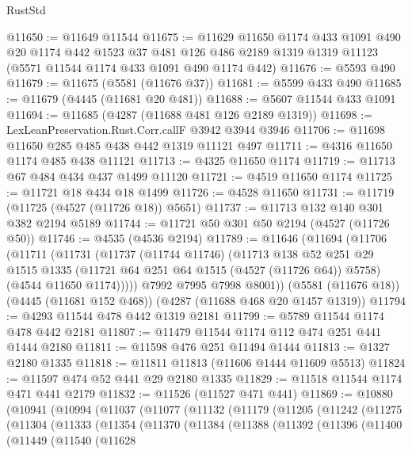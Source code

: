 \begin{lexlean}{RustStd}
\begin{coremodule}
@11650 := @11649 @11544
@11675 := @11629
    @11650
    @1174
    @433
    @1091
    @490
    @20
    @1174
    @442
    @1523
    @37
    @481
    @126
    @486
    @2189
    @1319
    @1319
    @11123
    (@5571 @11544 @1174 @433 @1091 @490 @1174 @442)
@11676 := @5593 @490
@11679 := @11675 (@5581 (@11676 @37))
@11681 := @5599 @433 @490
@11685 := @11679 (@4445 (@11681 @20 @481))
@11688 := @5607 @11544 @433 @1091
@11694 := @11685 (@4287 (@11688 @481 @126 @2189 @1319))
@11698 := LexLeanPreservation.Rust.Corr.callF @3942 @3944 @3946
@11706 := @11698 @11650 @285 @485 @438 @442 @1319 @11121 @497
@11711 := @4316 @11650 @1174 @485 @438 @11121
@11713 := @4325 @11650 @1174
@11719 := @11713 @67 @484 @434 @437 @1499 @11120
@11721 := @4519 @11650 @1174
@11725 := @11721 @18 @434 @18 @1499
@11726 := @4528 @11650
@11731 := @11719 (@11725 (@4527 (@11726 @18)) @5651)
@11737 := @11713 @132 @140 @301 @382 @2194 @5189
@11744 := @11721 @50 @301 @50 @2194 (@4527 (@11726 @50))
@11746 := @4535 (@4536 @2194)
@11789 := @11646
    (@11694
      (@11706
        (@11711
          (@11731
            (@11737
              (@11744 @11746)
              (@11713
                @138
                @52
                @251
                @29
                @1515
                @1335
                (@11721 @64 @251 @64 @1515 (@4527 (@11726 @64)) @5758)
                (@4544 @11650 @1174)))))
        @7992
        @7995
        @7998
        @8001))
    (@5581 (@11676 @18))
    (@4445 (@11681 @152 @468))
    (@4287 (@11688 @468 @20 @1457 @1319))
@11794 := @4293 @11544 @478 @442 @1319 @2181
@11799 := @5789 @11544 @1174 @478 @442 @2181
@11807 := @11479 @11544 @1174 @112 @474 @251 @441 @1444 @2180
@11811 := @11598 @476 @251 @11494 @1444
@11813 := @1327 @2180 @1335
@11818 := @11811 @11813 (@11606 @1444 @11609 @5513)
@11824 := @11597 @474 @52 @441 @29 @2180 @1335
@11829 := @11518 @11544 @1174 @471 @441 @2179
@11832 := @11526 (@11527 @471 @441)
@11869 := @10880
    (@10941
      (@10994
        (@11037
          (@11077
            (@11132
              (@11179
                (@11205
                  (@11242
                    (@11275
                      (@11304
                        (@11333
                          (@11354
                            (@11370
                              (@11384
                                (@11388
                                  (@11392
                                    (@11396
                                      (@11400
                                        (@11449
                                          (@11540
                                            (@11628

\end{coremodule}
\end{lexlean}
